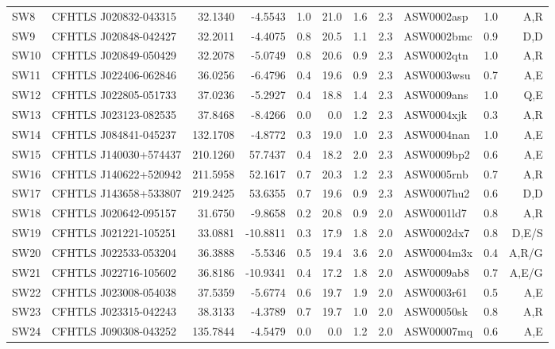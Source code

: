 \documentclass[useAMS,usenatbib,a4paper]{mn2e}
\begin{document}
\begin{center}
\begin{longtable}{llrrrrrrlrr}
 SW8 & CFHTLS J020832-043315 &   32.1340 &   -4.5543 &  1.0 & 21.0 &  1.6 &  2.3 & ASW0002asp &  1.0  &  A,R   \\
 SW9 & CFHTLS J020848-042427 &   32.2011 &   -4.4075 &  0.8 & 20.5 &  1.1 &  2.3 & ASW0002bmc &  0.9  &  D,D   \\
SW10 & CFHTLS J020849-050429 &   32.2078 &   -5.0749 &  0.8 & 20.6 &  0.9 &  2.3 & ASW0002qtn &  1.0  &  A,R   \\
SW11 & CFHTLS J022406-062846 &   36.0256 &   -6.4796 &  0.4 & 19.6 &  0.9 &  2.3 & ASW0003wsu &  0.7  &  A,E   \\
SW12 & CFHTLS J022805-051733 &   37.0236 &   -5.2927 &  0.4 & 18.8 &  1.4 &  2.3 & ASW0009ans &  1.0  &  Q,E   \\
SW13 & CFHTLS J023123-082535 &   37.8468 &   -8.4266 &  0.0 &  0.0 &  1.2 &  2.3 & ASW0004xjk &  0.3  &  A,R   \\
SW14 & CFHTLS J084841-045237 &  132.1708 &   -4.8772 &  0.3 & 19.0 &  1.0 &  2.3 & ASW0004nan &  1.0  &  A,E   \\
SW15 & CFHTLS J140030+574437 &  210.1260 &   57.7437 &  0.4 & 18.2 &  2.0 &  2.3 & ASW0009bp2 &  0.6  &  A,E   \\
SW16 & CFHTLS J140622+520942 &  211.5958 &   52.1617 &  0.7 & 20.3 &  1.2 &  2.3 & ASW0005rnb &  0.7  &  A,R   \\
SW17 & CFHTLS J143658+533807 &  219.2425 &   53.6355 &  0.7 & 19.6 &  0.9 &  2.3 & ASW0007hu2 &  0.6  &  D,D   \\
SW18 & CFHTLS J020642-095157 &   31.6750 &   -9.8658 &  0.2 & 20.8 &  0.9 &  2.0 & ASW0001ld7 &  0.8  &  A,R   \\
SW19 & CFHTLS J021221-105251 &   33.0881 &  -10.8811 &  0.3 & 17.9 &  1.8 &  2.0 & ASW0002dx7 &  0.8  &  D,E/S   \\
SW20 & CFHTLS J022533-053204 &   36.3888 &   -5.5346 &  0.5 & 19.4 &  3.6 &  2.0 & ASW0004m3x &  0.4  &  A,R/G   \\
SW21 & CFHTLS J022716-105602 &   36.8186 &  -10.9341 &  0.4 & 17.2 &  1.8 &  2.0 & ASW0009ab8 &  0.7  &  A,E/G   \\
SW22 & CFHTLS J023008-054038 &   37.5359 &   -5.6774 &  0.6 & 19.7 &  1.9 &  2.0 & ASW0003r61 &  0.5  &  A,E   \\
SW23 & CFHTLS J023315-042243 &   38.3133 &   -4.3789 &  0.7 & 19.7 &  1.0 &  2.0 & ASW00050sk &  0.8  &  A,R   \\
SW24 & CFHTLS J090308-043252 &  135.7844 &   -4.5479 &  0.0 &  0.0 &  1.2 &  2.0 & ASW00007mq &  0.6  &  A,E   \\

\end{longtable}
\end{center}
\end{document}
